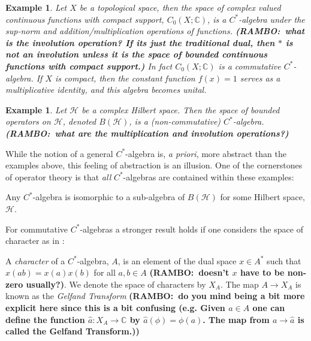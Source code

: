 \documentclass[final,leqno]{siamltex1213}
\newcommand{\ram}[1]{{\normalsize{\textbf{({\color{red}RAMBO:\ }#1)}}}}
\newtheorem{example}[theorem]{Example}
\begin{document}
\begin{example} \label{ex:function algebra}
	Let $X$ be a topological space, then the space of complex valued continuous functions with compact support, $C_{0}(X;\mathbb{C})$, is a $C^{*}$-algebra under the sup-norm and addition/multiplication operations of functions. \ram{what is the involution operation? If its just the traditional dual, then $*$ is not an involution unless it is the space of bounded continuous functions with compact support.}
	In fact $C_{0}(X;\mathbb{C})$ is a commutative $C^{*}$-algebra.  If $X$ is compact, then the constant function $f(x) = 1$ serves as a multiplicative identity, and this algebra becomes unital.
\end{example}

\begin{example}
	Let $\mathcal{H}$ be a complex Hilbert space. Then the space of bounded operators on $\mathcal{H}$, denoted $B(\mathcal{H})$, is a (non-commutative) $C^{*}$-algebra. \ram{what are the multiplication and involution operations?}
\end{example}

While the notion of a general $C^{*}$-algebra is, \textit{a priori}, more abstract than the examples above, this feeling of abstraction is an illusion.
One of the cornerstones of operator theory is that \emph{all} $C^{*}$-algebras are contained within these examples:

\begin{theorem} \label{thm:GN1}
	Any $C^{*}$-algebra is isomorphic to a sub-algebra of $B(\mathcal{H})$ for some Hilbert space, $\mathcal{H}$.
\end{theorem}

For commutative $C^{*}$-algebras a stronger result holds if one considers the space of character as in \cite{Bondia2001}:

\begin{definition}
	A \emph{character} of a $C^{*}$-algebra, $A$, is an element of the dual space $x \in A^{*}$ such that $x(ab) = x(a) x(b)$ for all $a,b \in A$ \ram{doesn't $x$ have to be non-zero usually?}.  
	We denote the space of characters by $X_{A}$.
	The map $A \to X_{A}$ is known as the \emph{Gelfand Transform} \ram{do you mind being a bit more explicit here since this is a bit confusing (e.g. Given $a \in A$ one can define the function $\hat{a}: X_{A} \to \mathbb{C}$ by $\hat{a}(\phi) = \phi(a)$. The map from $a \to \hat{a}$ is called the Gelfand Transform.)} 
\end{definition}
\end{document}
